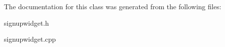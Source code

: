 The documentation for this class was generated from the following files\+:\begin{DoxyCompactItemize}
\item 
signupwidget.\+h\item 
signupwidget.\+cpp\end{DoxyCompactItemize}
